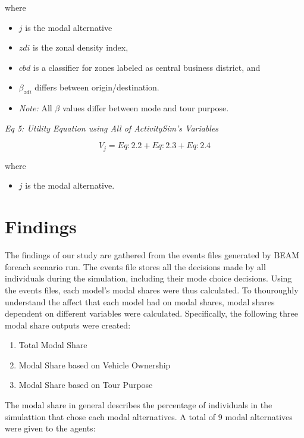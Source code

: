 \documentclass[3p, authoryear]{elsarticle} %
\providecommand{\tightlist}{%
  \setlength{\itemsep}{0pt}\setlength{\parskip}{0pt}}
\begin{document}
where

\begin{itemize}
\tightlist
\item
  \(j\) is the modal alternative
\item
  \(zdi\) is the zonal density index,
\item
  \(cbd\) is a classifier for zones labeled as central business district, and
\item
  \(\beta_{zdi}\) differs between origin/destination.
\item
  \emph{Note:} All \(\beta\) values differ between mode and tour purpose.
\end{itemize}

\emph{Eq 5: Utility Equation using All of ActivitySim's Variables}

\begin{equation}  
  V_j = Eq:2.2 + Eq:2.3 + Eq:2.4 \label{eq:label5}
\end{equation}

where

\begin{itemize}
\tightlist
\item
  \(j\) is the modal alternative.
\end{itemize}

\hypertarget{findings}{%
\section{Findings}\label{findings}}

The findings of our study are gathered from the events files generated by BEAM foreach scenario run. The events file stores all the decisions made by all individuals during the simulation, including their mode choice decisions. Using the events files, each model's modal shares were thus calculated. To thouroughly understand the affect that each model had on modal shares, modal shares dependent on different variables were calculated. Specifically, the following three modal share outputs were created:

\begin{enumerate}
\def\labelenumi{\arabic{enumi}.}
\tightlist
\item
  Total Modal Share
\item
  Modal Share based on Vehicle Ownership
\item
  Modal Share based on Tour Purpose
\end{enumerate}

The modal share in general describes the percentage of individuals in the simulattion that chose each modal alternatives. A total of 9 modal alternatives were given to the agents:
\end{document}
